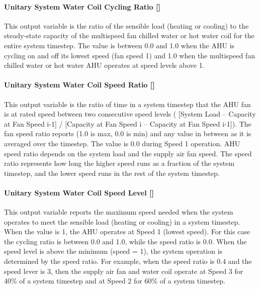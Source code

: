 \paragraph{Unitary System Water Coil Cycling Ratio {[]}}\label{unitary-system-water-coil-cycling-ratio}

This output variable is the ratio of the sensible load (heating or cooling) to the steady-state capacity of the multispeed fan chilled water or hot water coil for the entire system timestep. The value is between 0.0 and 1.0 when the AHU is cycling on and off its lowest speed (fan speed 1) and 1.0 when the multispeed fan chilled water or hot water AHU operates at speed levels above 1.

\paragraph{Unitary System Water Coil Speed Ratio {[]}}\label{unitary-system-water-coil-speed-ratio}

This output variable is the ratio of time in a system timestep that the AHU fan is at rated speed between two consecutive speed levels ( {[}System Load -- Capacity at Fan Speed i-1{]} / {[}Capacity at Fan Speed i -- Capacity at Fan Speed i-1{]}). The fan speed ratio reports (1.0 is max, 0.0 is min) and any value in between as it is averaged over the timestep. The value is 0.0 during Speed 1 operation. AHU speed ratio depends on the system load and the supply air fan speed. The speed ratio represents how long the higher speed runs as a fraction of the system timestep, and the lower speed runs in the rest of the system timestep.

\paragraph{Unitary System Water Coil Speed Level {[]}}\label{unitary-system-water-coil-speed-level}

This output variable reports the maximum speed needed when the system operates to meet the sensible load (heating or cooling) in a system timestep. When the value is 1, the AHU operates at Speed 1 (lowest speed). For this case the cycling ratio is between 0.0 and 1.0, while the speed ratio is 0.0. When the speed level is above the minimum (speed = 1), the system operation is determined by the speed ratio. For example, when the speed ratio is 0.4 and the speed lever is 3, then the supply air fan and water coil operate at Speed 3 for 40\% of a system timestep and at Speed 2 for 60\% of a system timestep.

